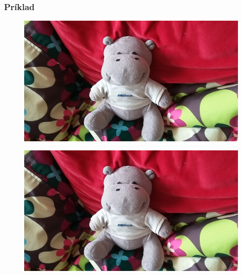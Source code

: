 \documentclass{beamer}
\begin{document}
\begin{frame}
    \frametitle{Príklad}
    \begin{figure}
    \includegraphics[height=0.4\textheight]{images/original.jpg}
    \end{figure}
    \begin{figure}
    \includegraphics[height=0.4\textheight]{images/embedded.jpg}
    \end{figure}
    
\end{frame}

% 
% 
\end{document}
